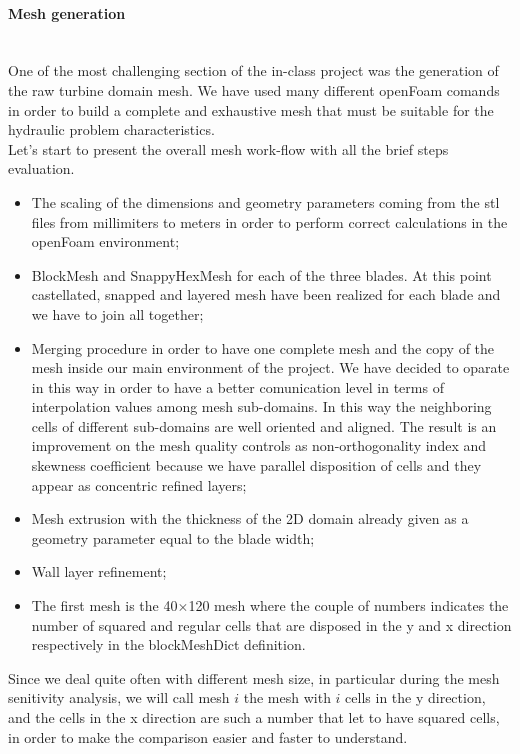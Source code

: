 \documentclass[a4paper,12pt]{article}
\begin{document}
\paragraph{Mesh generation}\mbox{}\\
One of the most challenging section of the in-class project was the generation of the raw turbine domain mesh. We have used many different openFoam comands in order to build a complete and exhaustive mesh that must be suitable for the hydraulic problem characteristics.
\\ 
Let's start to present the overall mesh work-flow with all the brief steps evaluation.
\\
\begin{itemize}
\item The scaling of the dimensions and geometry parameters coming from the stl files from millimiters to meters in order to perform correct calculations in the openFoam environment;

\item BlockMesh and SnappyHexMesh for each of the three blades. At this point castellated, snapped and layered mesh have been realized for each blade and we have to join all together;

\item Merging procedure in order to have one complete mesh and the copy of the mesh inside our main environment of the project. We have decided to oparate in this way in order to have a better comunication level in terms of interpolation values among mesh sub-domains. In this way the neighboring cells of different sub-domains are well oriented and aligned. The result is an improvement on the mesh quality controls as non-orthogonality index and skewness coefficient  because we have parallel disposition of cells and they appear as concentric refined layers;

\item Mesh extrusion with the thickness of the 2D domain already given as a geometry parameter equal to the blade width;

\item Wall layer refinement;

\item The first mesh is the 40$\times$120 mesh where the couple of numbers indicates the number of squared and regular cells that are disposed in the y and x direction respectively in the blockMeshDict definition.  
\end{itemize}

Since we deal quite often with different mesh size, in particular during the mesh senitivity analysis, we will call mesh $i$ the mesh with $i$ cells in the y direction, and the cells in the x direction are such a number that let to have squared cells, in order to make the comparison easier and faster to understand.
\end{document}
